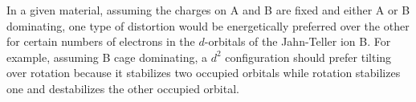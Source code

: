 \documentclass[a4paper,prb,twocolumn]{revtex4-1}  %
\begin{document}
In a given material,
assuming
the charges on A and B are fixed
and either A or B dominating,
one type of distortion 
would be energetically preferred
over the other
for certain
numbers of electrons in 
the $d$-orbitals of the Jahn-Teller ion B.
For example,
assuming B cage dominating,
a $d^2$ configuration
should prefer tilting over rotation
because it stabilizes two occupied orbitals 
while rotation stabilizes one and destabilizes the other occupied orbital.




 










\label{Bibliography}
%

\end{document}

